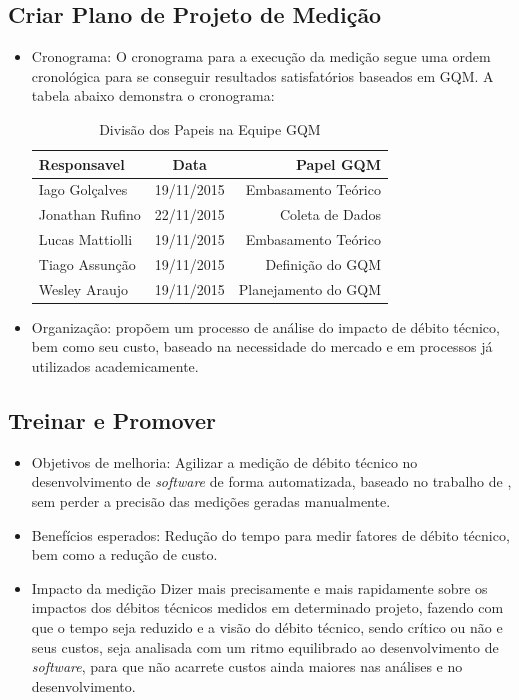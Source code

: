 \subsection{Criar Plano de Projeto de Medição}
\begin{itemize}
  \item Cronograma: O cronograma para a execução da medição segue uma ordem cronológica
  para se conseguir resultados satisfatórios baseados em GQM. A tabela abaixo demonstra
  o cronograma:

  \begin{table}[ht]
  \caption{Divisão dos Papeis na Equipe GQM}
  \centering
  \begin{tabular}{|l*{1}{c}r|}
  \hline
  Responsavel              & Data & Papel GQM \\
  \hline
  Iago Golçalves & 19/11/2015 &   Embasamento Teórico   \\
  \hline
  Jonathan  Rufino & 22/11/2015 &   Coleta de Dados\\
  \hline
  Lucas Mattiolli & 19/11/2015 &   Embasamento Teórico \\
  \hline
  Tiago Assunção & 19/11/2015 &   Definição do GQM  \\
  \hline
  Wesley Araujo & 19/11/2015 &   Planejamento do GQM \\
  \hline
  \end{tabular}
  \label{table:papeisgqm}
  \end{table}

\item Organização: \cite{td} propõem um processo de análise do impacto de débito técnico,
bem como seu custo, baseado na necessidade do mercado e em processos já utilizados academicamente.
\end{itemize}

\subsection{Treinar e Promover}
\begin{itemize}
\item Objetivos de melhoria: Agilizar a medição de débito técnico no desenvolvimento de \textit{software} de forma
automatizada, baseado no trabalho de \cite{td}, sem perder a precisão das medições geradas manualmente.

\item Benefícios esperados: \cite{td} Redução do tempo para medir fatores de débito técnico, bem como a
redução de custo.

\item Impacto da medição \cite{td} Dizer mais precisamente e mais rapidamente sobre os impactos dos débitos
técnicos medidos em determinado projeto, fazendo com que o tempo seja reduzido e a visão do débito técnico, sendo
crítico ou não e seus custos, seja analisada com um ritmo equilibrado ao desenvolvimento de \textit{software}, para que não acarrete
custos ainda maiores nas análises e no desenvolvimento.

\end{itemize}
